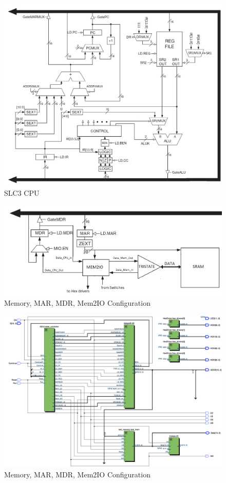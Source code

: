 \documentclass[journal, twocolumn, final,11pt,letterpaper]{IEEEtran}
\begin{document}
\begin{figure} [htbp]
	\centering
	\includegraphics[scale=0.27]{SLC3_Circuit.png}
	\caption{SLC3 CPU \label{fig:SLC3-Circuit}}
\end{figure}

\begin{figure} [htbp]
	\centering
	\includegraphics[scale=0.4]{Memory_Circuit.png}
	\caption{Memory, MAR, MDR, Mem2IO Configuration\label{fig:Memory-Circuit}}
\end{figure}

\begin{figure} [htbp]
	\centering
	\includegraphics[scale=0.4]{slc3_top_level_circuit.png}
	\caption{Memory, MAR, MDR, Mem2IO Configuration\label{fig:slc3-circuit}}
\end{figure}
\end{document}
